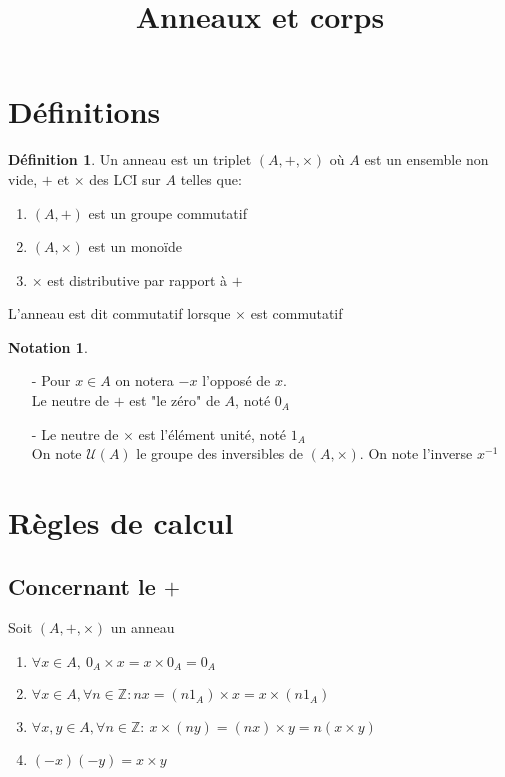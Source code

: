 \documentclass[fleqn]{article}
\title{Anneaux et corps}
\date{}
\theoremstyle{definition} \newtheorem*{defi}{D\'efinition}
\theoremstyle{definition} \newtheorem*{theo}{Th\'eor\`eme}
\theoremstyle{definition} \newtheorem*{coro}{Corollaire}
\theoremstyle{definition} \newtheorem*{nota}{Notation}
\theoremstyle{remark} \newtheorem*{rqs}{Remarques}
\theoremstyle{definition} \newtheorem*{prop}{Propri\'et\'e}
\begin{document}
\maketitle

\section{D\'efinitions}
\begin{defi}
	Un anneau est un triplet $(A, +, \times)$ o\`u $A$ est un ensemble non vide, $+$ et $\times$ des LCI sur $A$ telles que:
	\begin{enumerate}
		\item $(A, +)$ est un groupe commutatif
		\item $(A, \times)$ est un mono\"ide
		\item $\times$ est distributive par rapport \`a $+$
	\end{enumerate}
L'anneau est dit commutatif lorsque $\times$ est commutatif
\end{defi}

\begin{nota} $ $
	\begin{itemize}
		\item [-] Pour $x \in A$ on notera $-x$ l'oppos\'e de $x$.\\
			Le neutre de $+$ est "le z\'ero" de $A$, not\'e $0_A$
		\item [-] Le neutre de $\times$ est l'\'el\'ement unit\'e, not\'e $1_A$\\
			On note $\mathcal{U}(A)$ le groupe des inversibles de $(A, \times)$. On note l'inverse $x^{-1}$
	\end{itemize}
\end{nota}

\section{R\`egles de calcul}
\subsection{Concernant le $+$}
Soit $(A, +, \times)$ un anneau
\begin{enumerate}
	\item $\forall x \in A,\ 0_A \times x = x \times 0_A = 0_A$
	\item $\forall x \in A, \forall n \in \mathbb{Z}: nx = (n1_A) \times x = x \times (n1_A)$
	\item $\forall x,y \in A, \forall n \in \mathbb{Z}:\ x \times (ny) = (nx) \times y = n(x \times y)$
	\item $(-x)(-y) = x \times y$
\end{enumerate}
\end{document}
